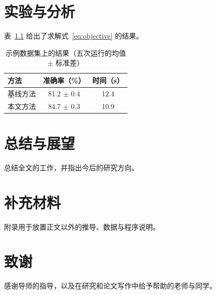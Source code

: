 \documentclass[UTF8,fontset=fandol]{pkuthss}
\newif\ifblind
\begin{document}
\chapter{实验与分析}
\label{chap:experiments}

表~\ref{tab:results} 给出了求解式~\eqref{eq:objective} 的结果。

\begin{table}[!htb]
  \centering
  \caption{示例数据集上的结果（五次运行的均值 $\pm$ 标准差）}
  \label{tab:results}
  \begin{tabular}{lcc}
    \toprule
    方法     & 准确率（\%）     & 时间（s） \\
    \midrule
    基线方法 & 81.2 $\pm$ 0.4 & 12.4      \\
    本文方法 & 84.7 $\pm$ 0.3 & 10.9      \\
    \bottomrule
  \end{tabular}
\end{table}

\chapter{总结与展望}
总结全文的工作，并指出今后的研究方向。

\printbibliography[heading=bibintoc, title={参考文献}]

\appendix

\chapter{补充材料}
附录用于放置正文以外的推导、数据与程序说明。

\backmatter

\ifblind\else
\chapter{致谢}
感谢导师的指导，以及在研究和论文写作中给予帮助的老师与同学。
\fi


\end{document}
